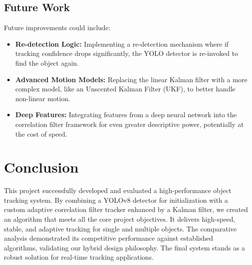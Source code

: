 \documentclass[12pt, a4paper]{report}
\begin{document}
\section{Future Work}
Future improvements could include:
\begin{itemize}
    \item \textbf{Re-detection Logic:} Implementing a re-detection mechanism where if tracking confidence drops significantly, the YOLO detector is re-invoked to find the object again.
    \item \textbf{Advanced Motion Models:} Replacing the linear Kalman filter with a more complex model, like an Unscented Kalman Filter (UKF), to better handle non-linear motion.
    \item \textbf{Deep Features:} Integrating features from a deep neural network into the correlation filter framework for even greater descriptive power, potentially at the cost of speed.
\end{itemize}


\chapter{Conclusion}
This project successfully developed and evaluated a high-performance object tracking system. By combining a YOLOv8 detector for initialization with a custom adaptive correlation filter tracker enhanced by a Kalman filter, we created an algorithm that meets all the core project objectives. It delivers high-speed, stable, and adaptive tracking for single and multiple objects. The comparative analysis demonstrated its competitive performance against established algorithms, validating our hybrid design philosophy. The final system stands as a robust solution for real-time tracking applications.

\newpage
\end{document}
